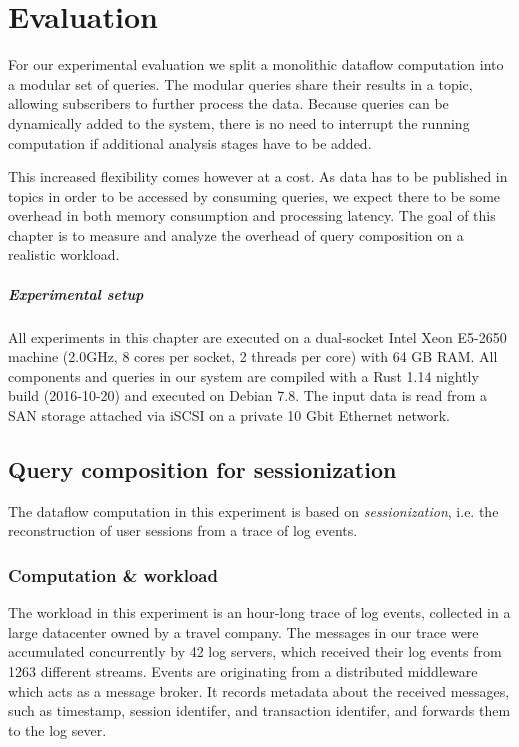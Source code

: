 \chapter{Evaluation}\label{ch:evaluation}

For our experimental evaluation we split a monolithic dataflow computation into a
modular set of queries. The modular queries share their results in a topic,
allowing subscribers to further process the data. Because queries
can be dynamically added to the system, there is no need to interrupt the
running computation if additional analysis stages have to be added.

This increased flexibility comes however at a cost. As data has to be published
in topics in order to be accessed by consuming queries, we expect there to be
some overhead in both memory consumption and processing latency. The goal
of this chapter is to measure and analyze the overhead of query composition
on a realistic workload.

\paragraph{Experimental setup}

All experiments in this chapter are executed on a dual-socket Intel Xeon E5-2650
machine (2.0GHz, 8 cores per socket, 2 threads per core) with 64 GB RAM. All components and
queries in our system are compiled with a Rust 1.14 nightly build (2016-10-20)
and executed on Debian 7.8. The input data is read from a SAN storage attached
via iSCSI on a private 10 Gbit Ethernet network.

\section{Query composition for sessionization}

The dataflow computation in this experiment is based on \emph{sessionization},
i.e. the reconstruction of user sessions from a trace of log events.

\subsection{Computation \& workload}

The workload in this experiment is an hour-long trace of log events, collected in
a large datacenter owned by a travel company. The messages in our trace were
accumulated concurrently by 42 log servers, which received their log events from
1263 different streams. Events are originating from a distributed middleware which acts
as a message broker. It records metadata about the received messages, such as
timestamp, session identifer, and transaction identifer, and forwards them to
the log sever.

